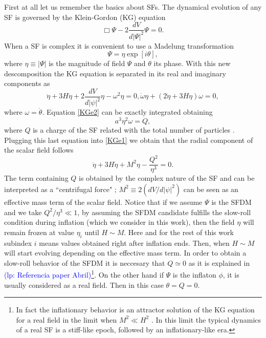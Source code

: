 \documentclass[amssymb,twocolumn,prd,nofootinbib,showpacs]{revtex4-1}
\newcommand{\lp}[1]{\textcolor{blue}{(lp: #1)}}
\begin{document}
First at all let us remember the basics about SFs. The dynamical evolution of any SF is governed by the Klein-Gordon (KG) equation
\begin{equation}
\Box\Psi-2\frac{dV}{d|\Psi|^2}\Psi=0.
\end{equation}
When a SF is complex it is convenient to use a Madelung transformation \cite{madelung}
\begin{equation}
\Psi = \eta \exp[i\theta],
\end{equation}
%
where $\eta\equiv |\Psi|$ is the magnitude of field $\Psi$ and $\theta$ its phase. With this new descomposition the KG equation is separated in its real and imaginary components as
%
\begin{subequations}\label{KESFDM}
\begin{equation}\label{KGe1}
\ddot\eta+3H\dot\eta+2\frac{dV}{d|\psi|^2}\eta-\omega^2\eta= 0,
\end{equation}
\begin{equation}\label{KGe2}
\dot\omega \eta + (2\dot\eta+3H\eta)\omega=0,
\end{equation}
\end{subequations}
%
where $\omega = \dot \theta$. Equation \eqref{KGe2} can be exactly integrated obtaining 
%
\begin{equation}
a^3\eta^2\omega=Q,
\end{equation}
%
where $Q$ is a charge of the SF related with the total number of particles \cite{SFphi42,charge1,SFphi41,charge3,charge4}. Plugging this last equation into \eqref{KGe1} we obtain that
the radial component of the scalar field follows
%
\begin{equation}\label{KGe3}
\ddot\eta+3H\dot\eta+M^2\eta-\frac{Q^2}{\eta^3}= 0.
\end{equation}
%
The term containing $Q$ is obtained by the complex nature of the SF \cite{SFphi42} and can be interpreted 
as a ``centrifugal force" \cite{charge4}; $M^2\equiv 2(dV/d|\psi|^2)$ can be seen as an effective mass term 
of the scalar field. Notice that if we assume $\Psi$ is the SFDM and we take $Q^2/\eta^3\ll 1$, by assuming the SFDM candidate fulfills the slow-roll condition during inflation (which we consider in this work), then the field $\eta$ will remain frozen at value $\eta_i$ until $H\sim M$. Here and for the rest of this work subindex $i$ means values obtained right after inflation ends. Then, when $H\sim M$ will start evolving depending on the effective mass term. In order to obtain a slow-roll behavior of the SFDM it is neccesary that $Q\simeq 0$ as it is explained in \lp{Referencia paper Abril}\footnote{In fact the inflationary behavior is an attractor solution of the KG equation for a real field in the limit when $M^2\ll H^2$ \cite{atractorinf1,atractorinf2}.
 In this limit the typical dynamics of a real SF is a stiff-like epoch, followed by an inflationary-like era. }. On the other hand if $\Psi$ is the inflaton $\phi$, it is usually considered as a real field. Then in this case $\theta=Q=0$.
 
\end{document}
